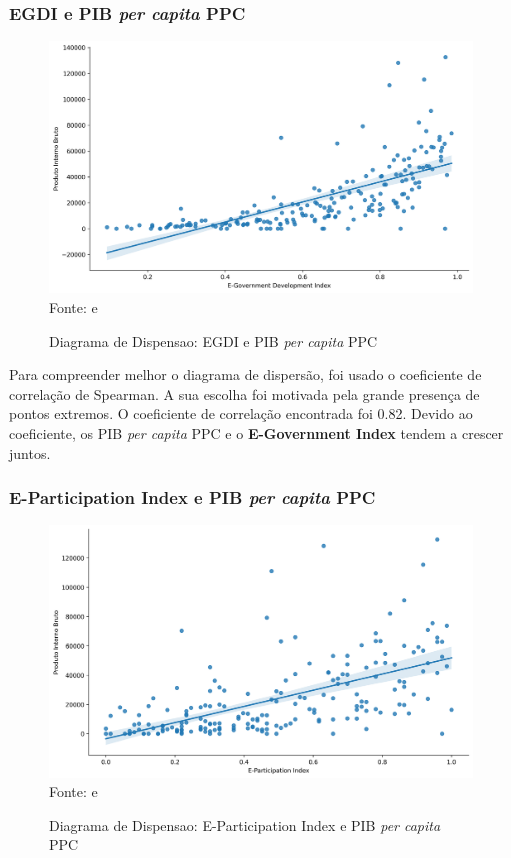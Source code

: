 \subsubsection{EGDI e PIB \textit{per capita} PPC}

\begin{figure}[H]
	\centering
	\caption{Diagrama de Dispensao: EGDI e PIB \textit{per capita} PPC}
	\includegraphics[width=1\linewidth]{figuras/egdi/dispensao_egov_pib}
	\label{fig:dispensao_egov_pib}
	\footnotesize{Fonte: \cite{ONU_EGDI} e \cite{WB_pib_per_capita_países}}
\end{figure}

Para compreender melhor o diagrama de dispersão, foi usado o coeficiente de correlação de Spearman. A sua escolha foi motivada pela grande presença de pontos extremos. O coeficiente de correlação encontrada foi 0.82. Devido ao coeficiente, os PIB \textit{per capita} PPC e o \textbf{E-Government Index} tendem a crescer juntos.

\subsubsection{E-Participation Index e PIB \textit{per capita} PPC}

\begin{figure}[H]
	\centering
	\caption{Diagrama de Dispensao: E-Participation Index e PIB \textit{per capita} PPC}
	\includegraphics[width=1\linewidth]{figuras/egdi/dispensao_epart_pib}
	\label{fig:dispensao_epart_pib}
	\footnotesize{Fonte: \cite{ONU_EGDI_mapa} e \cite{WB_pib_per_capita_países}}
\end{figure}

